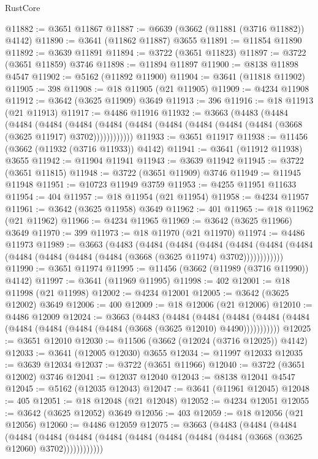 \begin{lexlean}{RustCore}
\begin{coremodule}
@11882 := @3651 @11867
@11887 := @6639 (@3662 (@11881 (@3716 @11882)) @4142)
@11890 := @3641 (@11862 @11887) @3655
@11891 := @11854 @11890
@11892 := @3639 @11891
@11894 := @3722 (@3651 @11823)
@11897 := @3722 (@3651 @11859) @3746
@11898 := @11894 @11897
@11900 := @8138 @11898 @4547
@11902 := @5162 (@11892 @11900)
@11904 := @3641 (@11818 @11902)
@11905 := 398
@11908 := @18 @11905 (@21 @11905)
@11909 := @4234 @11908
@11912 := @3642 (@3625 @11909) @3649
@11913 := 396
@11916 := @18 @11913 (@21 @11913)
@11917 := @4486 @11916
@11932 := @3663
    (@4483
      (@4484
        (@4484
          (@4484
            (@4484 (@4484 (@4484 (@4484 (@4484 (@4484 (@4484 (@3668 (@3625 @11917) @3702))))))))))))
@11933 := @3651 @11917
@11938 := @11456 (@3662 (@11932 (@3716 @11933)) @4142)
@11941 := @3641 (@11912 @11938) @3655
@11942 := @11904 @11941
@11943 := @3639 @11942
@11945 := @3722 (@3651 @11815)
@11948 := @3722 (@3651 @11909) @3746
@11949 := @11945 @11948
@11951 := @10723 @11949 @3759
@11953 := @4255 @11951 @11633
@11954 := 404
@11957 := @18 @11954 (@21 @11954)
@11958 := @4234 @11957
@11961 := @3642 (@3625 @11958) @3649
@11962 := 401
@11965 := @18 @11962 (@21 @11962)
@11966 := @4234 @11965
@11969 := @3642 (@3625 @11966) @3649
@11970 := 399
@11973 := @18 @11970 (@21 @11970)
@11974 := @4486 @11973
@11989 := @3663
    (@4483
      (@4484
        (@4484
          (@4484
            (@4484 (@4484 (@4484 (@4484 (@4484 (@4484 (@4484 (@3668 (@3625 @11974) @3702))))))))))))
@11990 := @3651 @11974
@11995 := @11456 (@3662 (@11989 (@3716 @11990)) @4142)
@11997 := @3641 (@11969 @11995)
@11998 := 402
@12001 := @18 @11998 (@21 @11998)
@12002 := @4234 @12001
@12005 := @3642 (@3625 @12002) @3649
@12006 := 400
@12009 := @18 @12006 (@21 @12006)
@12010 := @4486 @12009
@12024 := @3663
    (@4483
      (@4484
        (@4484
          (@4484 (@4484 (@4484 (@4484 (@4484 (@4484 (@4484 (@3668 (@3625 @12010) @4490)))))))))))
@12025 := @3651 @12010
@12030 := @11506 (@3662 (@12024 (@3716 @12025)) @4142)
@12033 := @3641 (@12005 @12030) @3655
@12034 := @11997 @12033
@12035 := @3639 @12034
@12037 := @3722 (@3651 @11966)
@12040 := @3722 (@3651 @12002) @3746
@12041 := @12037 @12040
@12043 := @8138 @12041 @4547
@12045 := @5162 (@12035 @12043)
@12047 := @3641 (@11961 @12045)
@12048 := 405
@12051 := @18 @12048 (@21 @12048)
@12052 := @4234 @12051
@12055 := @3642 (@3625 @12052) @3649
@12056 := 403
@12059 := @18 @12056 (@21 @12056)
@12060 := @4486 @12059
@12075 := @3663
    (@4483
      (@4484
        (@4484
          (@4484
            (@4484 (@4484 (@4484 (@4484 (@4484 (@4484 (@4484 (@3668 (@3625 @12060) @3702))))))))))))

\end{coremodule}
\end{lexlean}
